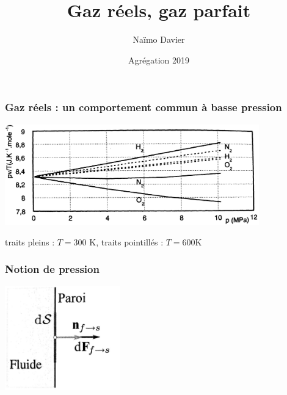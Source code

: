 \documentclass{beamer}
\title{Gaz réels, gaz parfait}
\author{Naïmo Davier}
\institute{Université Paul sabatier}
\date{Agrégation 2019}
\begin{document}
	
\begin{frame}
	\titlepage
\end{frame}

\addtocounter{framenumber}{-1}

\begin{frame}
\frametitle{Gaz réels : un comportement commun à basse pression}
\centerline{\includegraphics[width=11cm]{comportement_gaz_reels}}
\vspace{0.5cm}
traits pleins : $T = 300$ K, traits pointillés : $T=600$K
\end{frame}

\begin{frame}
\frametitle{Notion de pression}
\centerline{\includegraphics[width=5cm]{defP}}
\end{frame}
\end{document}
